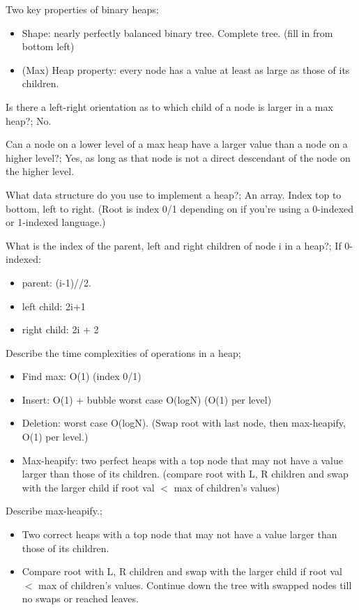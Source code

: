 \documentclass{article}
\begin{document}
Two key properties of binary heaps; \begin{itemize} \item Shape: nearly perfectly balanced binary tree. Complete tree. (fill in from bottom left) \item (Max) Heap property: every node has a value at least as large as those of its children.  \end{itemize}

Is there a left-right orientation as to which child of a node is larger in a max heap?; No.

Can a node on a lower level of a max heap have a larger value than a node on a higher level?; Yes, as long as that node is not a direct descendant of the node on the higher level.

What data structure do you use to implement a heap?; An array. Index top to bottom, left to right. (Root is index 0/1 depending on if you're using a 0-indexed or 1-indexed language.)

What is the index of the parent, left and right children of node i in a heap?; If 0-indexed: \begin{itemize} \item parent: (i-1)//2.  \item left child: 2i+1 \item right child: 2i + 2 \end{itemize}

Describe the time complexities of operations in a heap; \begin{itemize} \item Find max: O(1) (index 0/1) \item Insert: O(1) + bubble worst case O(logN) (O(1) per level) \item Deletion: worst case O(logN). (Swap root with last node, then max-heapify, O(1) per level.) \item Max-heapify: two perfect heaps with a top node that may not have a value larger than those of its children. (compare root with L, R children and swap with the larger child if root val $<$ max of children's values) \end{itemize}

Describe max-heapify.; \begin{itemize} \item Two correct heaps with a top node that may not have a value larger than those of its children.  \item Compare root with L, R children and swap with the larger child if root val $<$ max of children's values. Continue down the tree with swapped nodes till no swaps or reached leaves.  \end{itemize} 
\end{document}
